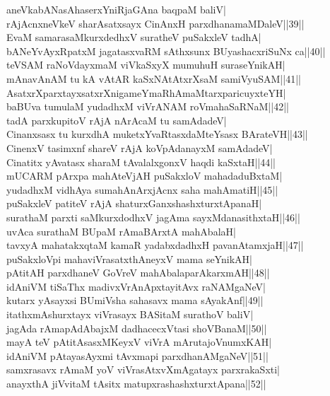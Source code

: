 \documentclass{article}
\begin{document}
aneVkabANasAhaserxYniRjaGAna baqpaM baliV|\\
rAjAcnxneVkeV sharAsatxsayx CinAnxH parxdhanamaMDaleV||39||\\
EvaM samarasaMkurxdedhxV suratheV puSakxleV tadhA|\\
bANeYvAyxRpatxM jagatasxvaRM sAthxsunx BUyashacxriSuNx ca||40||\\
teVSAM raNoVdayxmaM viVkaSxyX mumuhuH suraseYnikAH|\\
mAnavAnAM tu kA vAtAR kaSxNAtAtxrXsaM samiVyuSAM||41||\\
AsatxrXparxtayxsatxrXnigameYmaRhAmaMtarxparicuyxteYH|\\
baBUva tumulaM yudadhxM viVrANAM roVmahaSaRNaM||42||\\
tadA parxkupitoV rAjA nArAcaM tu samAdadeV|\\
Cinanxsasx tu kurxdhA muketxYvaRtasxdaMteYsasx BArateVH||43||\\
CinenxV tasimxnf shareV rAjA koVpAdanayxM samAdadeV|\\
Cinatitx yAvatasx sharaM tAvalalxgonxV haqdi kaSxtaH||44||\\
mUCARM pArxpa mahAteVjAH puSakxloV mahadaduBxtaM|\\
yudadhxM vidhAya sumahAnArxjAcnx saha mahAmatiH||45||\\
puSakxleV patiteV rAjA shaturxGanxshashxturxtApanaH|\\
surathaM parxti saMkurxdodhxV jagAma sayxMdanasithxtaH||46||\\
uvAca surathaM BUpaM rAmaBArxtA mahAbalaH|\\
tavxyA mahatakxqtaM kamaR yadabxdadhxH pavanAtamxjaH||47||\\
puSakxloVpi mahaviVrasatxthAneyxV mama seYnikAH|\\
pAtitAH parxdhaneV GoVreV mahAbalaparAkarxmAH||48||\\
idAniVM tiSaThx madivxVrAnApxtayitAvx raNAMgaNeV|\\
kutarx yAsayxsi BUmiVsha sahasavx mama sAyakAnf||49||\\
itathxmAshurxtayx viVrasayx BASitaM surathoV baliV|\\
jagAda rAmapAdAbajxM dadhacecxVtasi shoVBanaM||50||\\
mayA teV pAtitAsasxMKeyxV viVrA mArutajoVnumxKAH|\\
idAniVM pAtayasAyxmi tAvxmapi parxdhanAMgaNeV||51||\\
samxrasavx rAmaM yoV viVrasAtxvXmAgatayx parxrakaSxti|\\
anayxthA jiVvitaM tAsitx matupxrashashxturxtApana||52||\\
\end{document}
